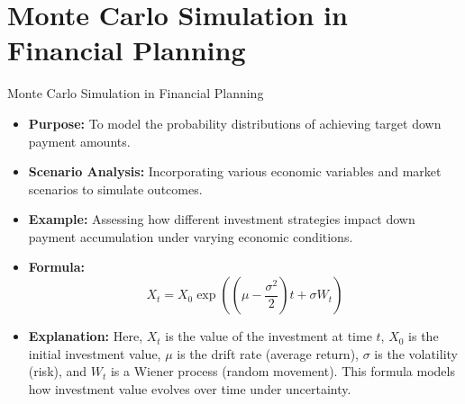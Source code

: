 \documentclass{beamer}
\begin{document}
\section{Monte Carlo Simulation in Financial Planning}
\begin{frame}{Monte Carlo Simulation in Financial Planning}
    \begin{itemize}
        \item \textbf{Purpose:} To model the probability distributions of achieving target down payment amounts.
        \item \textbf{Scenario Analysis:} Incorporating various economic variables and market scenarios to simulate outcomes.
        \item \textbf{Example:} Assessing how different investment strategies impact down payment accumulation under varying economic conditions.
        \item \textbf{Formula:}
        \begin{equation*}
            X_t = X_0 \exp \left( \left( \mu - \frac{\sigma^2}{2} \right)t + \sigma W_t \right)
        \end{equation*}
        \item \textbf{Explanation:} Here, \( X_t \) is the value of the investment at time \( t \), \( X_0 \) is the initial investment value, \( \mu \) is the drift rate (average return), \( \sigma \) is the volatility (risk), and \( W_t \) is a Wiener process (random movement). This formula models how investment value evolves over time under uncertainty.
    \end{itemize}
\end{frame}
\end{document}
